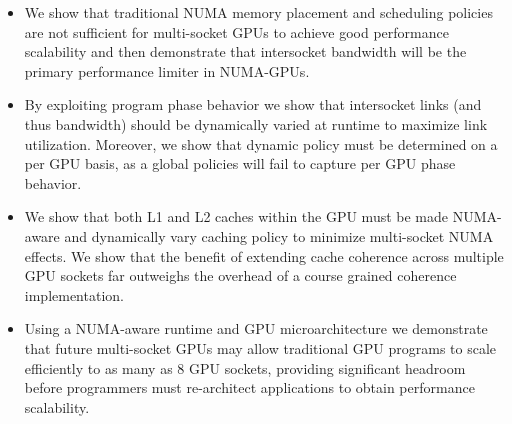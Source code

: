 \begin{itemize}

\item We show that traditional NUMA memory placement and 
scheduling policies are not sufficient for multi-socket GPUs to achieve good 
performance scalability and then demonstrate that intersocket bandwidth will be 
the primary performance limiter in NUMA-GPUs.

\item By exploiting program phase behavior we show that intersocket links (and 
thus bandwidth) should be dynamically varied at runtime to maximize link 
utilization. Moreover, we show that dynamic policy must be determined on a per 
GPU basis, as a global policies will fail to capture per GPU phase behavior.

\item We show that both L1 and L2 caches within the GPU must be made NUMA-aware 
and dynamically vary caching policy to minimize multi-socket NUMA effects.  We 
show that the benefit of extending cache coherence across multiple GPU sockets 
far outweighs the overhead of a course grained coherence implementation.

\item Using a NUMA-aware runtime and GPU microarchitecture we demonstrate that
future  multi-socket GPUs may allow traditional GPU programs to scale efficiently to as 
many as 8 GPU sockets, providing significant headroom before programmers must 
re-architect applications to obtain performance scalability.

\end{itemize}
